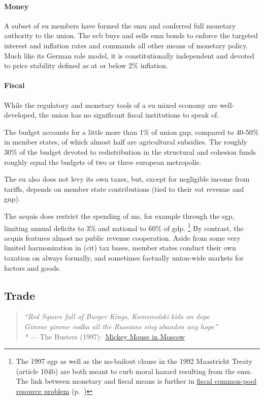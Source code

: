 \paragraph{Money} A subset of \gls{eu} members have formed the \gls{emu} and conferred full monetary authority to the union.
The \gls{ecb} buys and sells \gls{emu} bonds to enforce the targeted interest and inflation rates and commands all other means of monetary policy.
Much like its German role model, it is constitutionally independent and devoted to price stability defined as at or below 2\% inflation.

\paragraph{Fiscal} While the regulatory and monetary tools of a \gls{eu} mixed economy are well-developed, the union has no significant fiscal institutions to speak of.


The budget accounts for a little more than 1\% of union \gls{gnp}, compared to 40-50\% in member states, of which almost half are agricultural subsidies.
The roughly 30\% of the budget devoted to redistribution in the structural and cohesion funds roughly equal the budgets of two or three european metropolis.

The \gls{eu} also does not levy its own taxes, but, except for negligible income from tariffs, depends on member state contributions (tied to their \gls{vat} revenue and \gls{gnp}).

The acquis does restrict the spending of \gls{ms}, for example through the \gls{sgp}, limiting annual deficits to 3\% and national to 60\% of \gls{gdp}.
\footnote{
	The 1997 \gls{sgp} as well as the no-bailout clause in the 1992 Maastricht Treaty (article 104b) are both meant to curb moral hazard resulting from the \gls{emu}.
	The link between monetary and fiscal means is further in \hyperref[sec:fiscal-CPR]{fiscal common-pool resource problem} (p.~\pageref{sec:fiscal-CPR})
}
By contrast, the acquis features almost no public revenue cooperation.
Aside from some very limited harmonization in (\gls{cit}) tax bases, member states conduct their own taxation on always formally, and sometimes factually union-wide markets for factors and goods.

\subsection[Trade]{Trade}
\begin{verse}
	\emph{``Red Square full of Burger Kings, Komsmolski kids on dope \\
	Gimme gimme vodka all the Russians sing abandon any hope''\\*}
	--- The Busters (1997):\ \href{http://www.youtube.com/watch?v=xsxRMOnpMTY}{Mickey Mouse in Moscow}\\
\end{verse}

